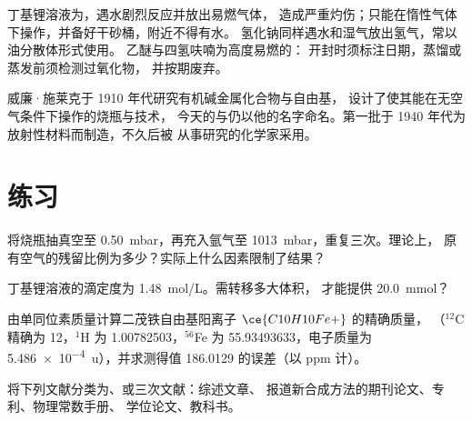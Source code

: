 \begin{safety}{}
丁基锂溶液为，遇水剧烈反应并放出易燃气体，
造成严重灼伤；只能在惰性气体下操作，并备好干砂桶，附近不得有水。
氢化钠同样遇水和湿气放出氢气，常以油分散体形式使用。
乙醚与四氢呋喃为高度易燃的：
开封时须标注日期，蒸馏或蒸发前须检测过氧化物，
并按期废弃。
\end{safety}

\begin{history}[施莱克的玻璃仪器]
威廉·施莱克于 1910 年代研究有机碱金属化合物与自由基，
设计了使其能在无空气条件下操作的烧瓶与技术，
今天的与仍以他的名字命名。第一批于
1940 年代为放射性材料而制造，不久后被
从事研究的化学家采用。
\end{history}

\section{练习}

\begin{exercise}[$\star$]\label{exo:b3:lab-techniques-3:1}
将烧瓶抽真空至 \qty{0.50}{mbar}，再充入氩气至 \qty{1013}{mbar}，重复三次。理论上，
原有空气的残留比例为多少？实际上什么因素限制了结果？
\end{exercise}

\begin{exercise}[$\star$]\label{exo:b3:lab-techniques-3:2}
丁基锂溶液的滴定度为 \qty{1.48}{mol/L}。需转移多大体积，
才能提供 \qty{20.0}{mmol}？
\end{exercise}

\begin{exercise}[$\star$]\label{exo:b3:lab-techniques-3:3}
由单同位素质量计算二茂铁自由基阳离子 $\ce{C10H10Fe+}$ 的精确质量，
（$^{12}$C 精确为 12，$^1$H 为 1.00782503，$^{56}$Fe 为 55.93493633，电子质量为 \qty{5.486e-4}{u}），并求测得值
186.0129 的误差（以 ppm 计）。
\end{exercise}

\begin{exercise}[$\star$]\label{exo:b3:lab-techniques-3:4}
将下列文献分类为、或三次文献：综述文章、
报道新合成方法的期刊论文、专利、物理常数手册、
学位论文、教科书。
\end{exercise}

